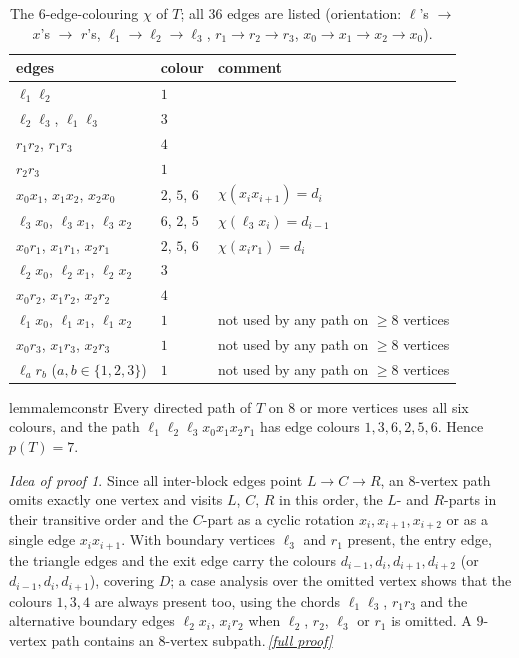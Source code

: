 \documentclass[11pt,a4paper]{article}
\theoremstyle{plain}
\theoremstyle{definition}
\theoremstyle{remark}
\newtheorem*{proofidea}{Idea of proof}
\newcommand{\fullproofref}[1]{\,\hyperref[#1]{\textit{[full proof]}}}
\newcommand{\col}{\chi}
\newcommand{\pth}{p}
\newcommand{\lv}{\ell}
\begin{document}
\begin{table}[ht]
\centering
\small
\begin{tabular}{@{}lll@{}}
\toprule
edges & colour & comment\\
\midrule
$\lv_1\lv_2$ & $1$ & \\
$\lv_2\lv_3$, $\lv_1\lv_3$ & $3$ & \\
$r_1r_2$, $r_1r_3$ & $4$ & \\
$r_2r_3$ & $1$ & \\
$x_0x_1$, $x_1x_2$, $x_2x_0$ & $2$, $5$, $6$ & $\col(x_ix_{i+1})=d_i$\\
$\lv_3x_0$, $\lv_3x_1$, $\lv_3x_2$ & $6$, $2$, $5$ & $\col(\lv_3x_i)=d_{i-1}$\\
$x_0r_1$, $x_1r_1$, $x_2r_1$ & $2$, $5$, $6$ & $\col(x_ir_1)=d_i$\\
$\lv_2x_0$, $\lv_2x_1$, $\lv_2x_2$ & $3$ & \\
$x_0r_2$, $x_1r_2$, $x_2r_2$ & $4$ & \\
$\lv_1x_0$, $\lv_1x_1$, $\lv_1x_2$ & $1$ & not used by any path on $\ge8$ vertices\\
$x_0r_3$, $x_1r_3$, $x_2r_3$ & $1$ & not used by any path on $\ge8$ vertices\\
$\lv_ar_b$ ($a,b\in\{1,2,3\}$) & $1$ & not used by any path on $\ge8$ vertices\\
\bottomrule
\end{tabular}
\caption{The $6$-edge-colouring $\col$ of $T$; all $36$ edges are listed (orientation: $\lv$'s $\to$ $x$'s $\to$ $r$'s, $\lv_1\to\lv_2\to\lv_3$, $r_1\to r_2\to r_3$, $x_0\to x_1\to x_2\to x_0$).}
\label{tab:colouring}
\end{table}

\begin{restatable}{lemma}{lemconstr}\label{lem:construction}
Every directed path of $T$ on $8$ or more vertices uses all six colours, and the path $\lv_1\lv_2\lv_3x_0x_1x_2r_1$ has edge colours $1,3,6,2,5,6$. Hence $\pth(T)=7$.
\end{restatable}
\begin{proofidea}
Since all inter-block edges point $L\to C\to R$, an $8$-vertex path omits exactly one vertex and visits $L$, $C$, $R$ in this order, the $L$- and $R$-parts in their transitive order and the $C$-part as a cyclic rotation $x_i,x_{i+1},x_{i+2}$ or as a single edge $x_ix_{i+1}$. With boundary vertices $\lv_3$ and $r_1$ present, the entry edge, the triangle edges and the exit edge carry the colours $d_{i-1},d_i,d_{i+1},d_{i+2}$ (or $d_{i-1},d_i,d_{i+1}$), covering $D$; a case analysis over the omitted vertex shows that the colours $1,3,4$ are always present too, using the chords $\lv_1\lv_3$, $r_1r_3$ and the alternative boundary edges $\lv_2x_i$, $x_ir_2$ when $\lv_2$, $r_2$, $\lv_3$ or $r_1$ is omitted. A $9$-vertex path contains an $8$-vertex subpath.\fullproofref{pf:construction}
\end{proofidea}
\end{document}
